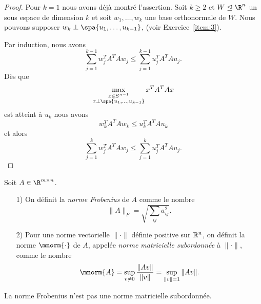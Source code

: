 \begin{proof}
Pour $k=1$ nous avons déjà montré l'assertion. Soit $k \geq 2$ et $W \trianglelefteq \R^n$ un sous espace de dimension $k$ et soit $w_1,\dots,w_k$ une base orthonormale de $W$. 
Nous pouvons supposer $w_k \perp \spa\{u_1,\dots,u_{k-1}\}$, (voir Exercice~\ref{item:3}). 

Par induction, nous avons 
\begin{displaymath}
  \sum_{j=1}^{k-1} w_j^TA^TAw_j \leq  \sum_{j=1}^{k-1} u_j^TA^TAu_j.
\end{displaymath}
Dès que   
\begin{displaymath}
  \max_{\substack{x \in S^{n-1} \\ x \perp \spa\{u_1,\dots,u_{k-1}\}}} x^TA^TAx 
\end{displaymath}
est atteint à $u_k$ nous avons 
\begin{displaymath}
  w_k^TA^TAw_k \leq u_k^TA^TAu_k
\end{displaymath}
et alors
\begin{displaymath}
  \sum_{j=1}^{k} w_j^TA^TAw_j \leq  \sum_{j=1}^{k} u_j^TA^TAu_j.
\end{displaymath}

\end{proof}


\begin{definition}
  \label{def:26}
  Soit $A \in \R^{m \times n}$.
  \begin{enumerate}
 
  \item[1)] On définit la \emph{norme Frobenius} de $A$ comme le nombre 
  \begin{displaymath}
    \|A\|_F = \sqrt{\sum_{ij}a_{ij}^2}.
  \end{displaymath}
  
  \item[2)] Pour une norme vectorielle $\|\cdot\|$ définie positive sur $\Bbb R^n$, on définit la norme $\mnorm{\cdot}$ de $A$, appelée \emph{norme matricielle subordonnée} à $\|\cdot\|$, comme le nombre 
   \begin{displaymath}
    	\mnorm{A} = \sup_{v \neq 0} \frac{\|Av\|}{\|v\|} = \sup_{\|v\| = 1} \|Av\|.
  \end{displaymath}
  
   \end{enumerate}
\end{definition}

\begin{remark}
	La norme Frobenius n'est pas une norme matricielle subordonnée.
\end{remark}


